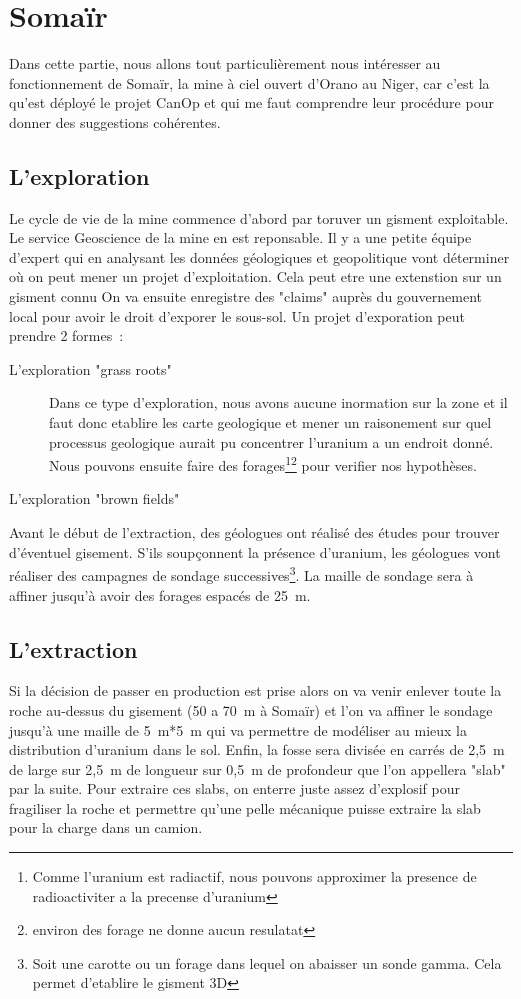 

\section{Somaïr}
Dans cette partie, nous allons tout particulièrement nous intéresser au fonctionnement de Somaïr, la mine à ciel ouvert d'Orano au Niger, car c'est la qu'est déployé le projet CanOp et qui me faut comprendre leur procédure pour donner des suggestions cohérentes.
\subsection{L'exploration}

Le cycle de vie de la mine commence d'abord par toruver un gisment exploitable. Le service Geoscience de la mine en est reponsable. Il y a une petite équipe d'expert qui en analysant les données géologiques et geopolitique vont déterminer où on peut mener un projet d'exploitation. Cela peut etre une extenstion sur un gisment connu On va ensuite enregistre des "claims" auprès du gouvernement local pour avoir le droit d'exporer le sous-sol. Un projet d'exporation peut prendre 2 formes~:
\begin{description}
    \item[L'exploration "grass roots"] Dans ce type d'exploration, nous avons aucune inormation sur la zone et il faut donc etablire les carte geologique et mener un raisonement sur quel processus geologique aurait pu concentrer l'uranium a un endroit donné. Nous pouvons ensuite faire des forages\footnote{Comme l'uranium est radiactif, nous pouvons approximer la presence de radioactiviter a la precense d'uranium}\footnote{environ  des forage ne donne aucun resulatat} pour verifier nos hypothèses. 
    \item[L'exploration "brown fields"]
\end{description}

Avant le début de l'extraction, des géologues ont réalisé des études pour trouver d'éventuel gisement. S'ils soupçonnent la présence d'uranium, les géologues vont réaliser des campagnes de sondage successives\footnote{Soit une carotte ou un forage dans lequel on abaisser un 
sonde gamma. Cela permet d'etablire le gisment 3D}. La maille de sondage sera à affiner jusqu'à avoir des forages espacés de 25~m. 
\subsection{L'extraction}
\label{ssec_extraction}
Si la décision de passer en production est prise alors on va venir enlever toute la roche au-dessus du gisement (50 a 70~m à Somaïr) et l’on va affiner le sondage jusqu'à une maille de 5~m*5~m qui va permettre de modéliser au mieux la distribution d'uranium dans le sol. Enfin, la fosse sera divisée en carrés de 2,5~m de large sur 2,5~m de longueur sur 0,5~m de profondeur que l'on appellera "slab" par la suite. Pour extraire ces slabs, on enterre juste assez d'explosif pour fragiliser la roche et permettre qu'une pelle mécanique puisse extraire la slab pour la charge dans un camion.
